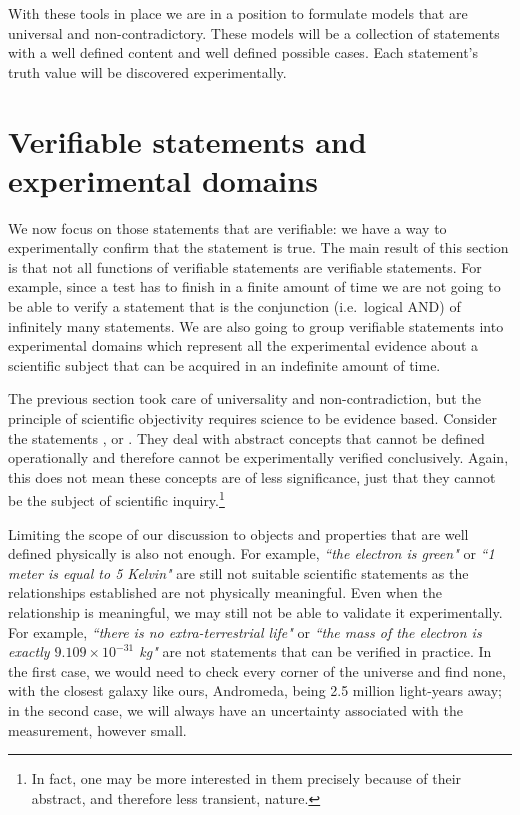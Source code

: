 	With these tools in place we are in a position to formulate models that are universal and non-contradictory. These models will be a collection of statements with a well defined content and well defined possible cases. Each statement's truth value will be discovered experimentally.
	
	\section{Verifiable statements and experimental domains}
	
	We now focus on those statements that are verifiable: we have a way to experimentally confirm that the statement is true. The main result of this section is that not all functions of verifiable statements are verifiable statements. For example, since a test has to finish in a finite amount of time we are not going to be able to verify a statement that is the conjunction (i.e.~logical AND) of infinitely many statements. We are also going to group verifiable statements into experimental domains which represent all the experimental evidence about a scientific subject that can be acquired in an indefinite amount of time.
	
	The previous section took care of universality and non-contradiction, but the principle of scientific objectivity requires science to be evidence based. Consider the statements ,  or . They deal with abstract concepts that cannot be defined operationally and therefore cannot be experimentally verified conclusively.  Again, this does not mean these concepts are of less significance, just that they cannot be the subject of scientific inquiry.\footnote{In fact, one may be more interested in them precisely because of their abstract, and therefore less transient, nature.}
	
	Limiting the scope of our discussion to objects and properties that are well defined physically is also not enough. For example, \emph{``the electron is green"} or \emph{``1 meter is equal to 5 Kelvin"} are still not suitable scientific statements as the relationships established are not physically meaningful. Even when the relationship is meaningful, we may still not be able to validate it experimentally. For example, \emph{``there is no extra-terrestrial life"} or \emph{``the mass of the electron is exactly $9.109 \times 10^{-31}$ kg"} are not statements that can be verified in practice. In the first case, we would need to check every corner of the universe and find none, with the closest galaxy like ours, Andromeda, being 2.5 million light-years away; in the second case, we will always have an uncertainty associated with the measurement, however small.
	
